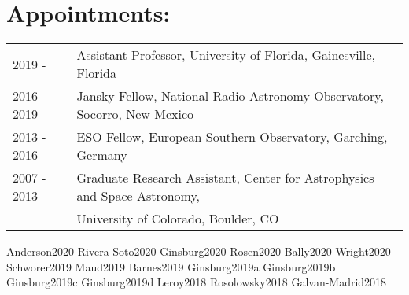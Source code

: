 \documentclass[12pt]{article}
\begin{document}
\section{Appointments:}
\begin{listliketab}
    \begin{tabular}{p{0.8in}p{6.2in}}
    2019 -      & Assistant Professor, University of Florida,  Gainesville, Florida \\
    2016 - 2019 & Jansky Fellow, National Radio Astronomy Observatory, Socorro, New Mexico \\
    2013 - 2016 & ESO Fellow, European Southern Observatory, Garching, Germany \\
    2007 - 2013  & Graduate Research Assistant, Center for Astrophysics and Space Astronomy,\\
     & University of Colorado, Boulder, CO \\
    \end{tabular}
\end{listliketab}


%


%





\nocite{biba}{Anderson2020}
\nocite{biba}{Rivera-Soto2020}
\nocite{biba}{Ginsburg2020}
\nocite{biba}{Rosen2020}
\nocite{biba}{Bally2020}
\nocite{biba}{Wright2020}
\nocite{biba}{Schworer2019}
\nocite{biba}{Maud2019}
\nocite{biba}{Barnes2019}
\nocite{biba}{Ginsburg2019a}
\nocite{biba}{Ginsburg2019b}
\nocite{biba}{Ginsburg2019c}
\nocite{biba}{Ginsburg2019d}
\nocite{biba}{Leroy2018}
\nocite{biba}{Rosolowsky2018}
\nocite{biba}{Galvan-Madrid2018}
\end{document}
